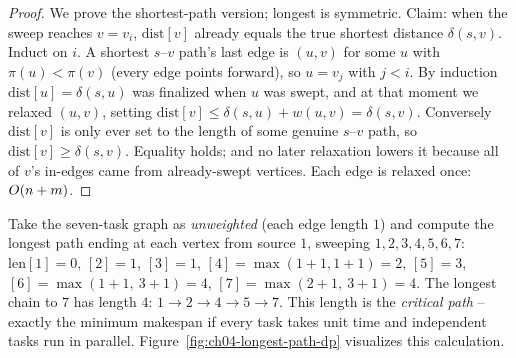 \begin{proof}
We prove the shortest-path version; longest is symmetric. Claim: when the sweep reaches $v=v_i$,
$\mathrm{dist}[v]$ already equals the true shortest distance $\delta(s,v)$. Induct on $i$. A shortest
$s$--$v$ path's last edge is $(u,v)$ for some $u$ with $\pi(u)<\pi(v)$ (every edge points forward), so
$u=v_j$ with $j<i$. By induction $\mathrm{dist}[u]=\delta(s,u)$ was finalized when $u$ was swept, and
at that moment we relaxed $(u,v)$, setting $\mathrm{dist}[v]\le\delta(s,u)+w(u,v)=\delta(s,v)$.
Conversely $\mathrm{dist}[v]$ is only ever set to the length of some genuine $s$--$v$ path, so
$\mathrm{dist}[v]\ge\delta(s,v)$. Equality holds; and no later relaxation lowers it because all of
$v$'s in-edges came from already-swept vertices. Each edge is relaxed once: $O(n+m)$.
\end{proof}

\begin{labbox}
Take the seven-task graph as \emph{unweighted} (each edge length $1$) and compute the longest path
ending at each vertex from source $1$, sweeping $1,2,3,4,5,6,7$:
$\mathrm{len}[1]{=}0$, $[2]{=}1$, $[3]{=}1$, $[4]{=}\max(1{+}1,1{+}1){=}2$, $[5]{=}3$,
$[6]{=}\max(1{+}1,\ 3{+}1){=}4$, $[7]{=}\max(2{+}1,\ 3{+}1){=}4$. The longest chain to $7$ has length
$4$: $1\to 2\to 4\to 5\to 7$. This length is the \emph{critical path} -- exactly the minimum makespan
if every task takes unit time and independent tasks run in parallel. Figure~\ref{fig:ch04-longest-path-dp} visualizes this calculation.
\end{labbox}

